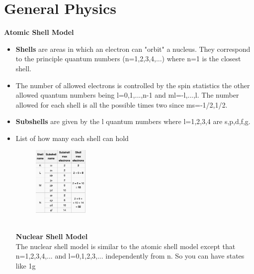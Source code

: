\documentclass[12pt]{extarticle}
\begin{document}
\section*{General Physics}
\textbf{Atomic Shell Model}
\begin{itemize}
   \item \textbf{Shells} are areas in which an electron can "orbit" a nucleus. They correspond to the principle quantum numbers (n=1,2,3,4,...) where n=1 is the closest shell.
   \item The number of allowed electrons is controlled by the spin statistics the other allowed quantum numbers being l=0,1,...,n-1 and ml=-l,...,l. The number allowed for each shell is all the possible times two since ms=-1/2,1/2.
   \item \textbf{Subshells} are given by the l quantum numbers where l=1,2,3,4 are s,p,d,f,g.
   \item List of how many each shell can hold
   \begin{figure}[h!]
      \includegraphics[width=0.25\textwidth]{shell.png}
   \end{figure}
\\
\textbf{Nuclear Shell Model} \\
The nuclear shell model is similar to the atomic shell model except that n=1,2,3,4,... and l=0,1,2,3,... independently from n. So you can have states like 1g
   
\end{itemize}
\end{document}
